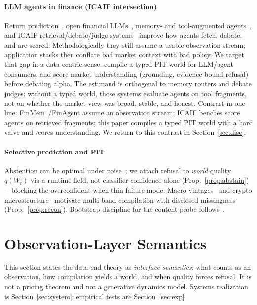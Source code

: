 \documentclass[sigconf,anonymous]{acmart}
\theoremstyle{acmdefinition}%
\theoremstyle{acmplain}%
\begin{document}
\paragraph{LLM agents in finance (ICAIF intersection)}
Return prediction~\cite{lopez2023chatgpt}, open financial LLMs~\cite{yang2023fingpt}, memory- and tool-augmented agents~\cite{yu2023finmem,li2023tradinggpt,zhang2024finagent,yao2023react}, and ICAIF retrieval/debate/judge systems~\cite{choi2025finagentbench,shen2025finsearch,sun2025finresearchbench,duan2025factormad} improve how agents fetch, debate, and are scored.
Methodologically they still assume a usable observation stream; application stacks then conflate bad market context with bad policy.
We target that gap in a data-centric sense: compile a typed PIT world for LLM/agent consumers, and score market understanding (grounding, evidence-bound refusal) before debating alpha.
The estimand is orthogonal to memory routers and debate judges: without a typed world, those systems evaluate agents on tool fragments, not on whether the market view was broad, stable, and honest.
Contrast in one line: FinMem~/FinAgent assume an observation stream; ICAIF benches score agents on retrieved fragments; this paper compiles a typed PIT world with a hard valve and scores understanding.
We return to this contrast in Section~\ref{sec:disc}.

\paragraph{Selective prediction and PIT}
Abstention can be optimal under noise~\cite{elyaniv2010,geifman2017}; we attach refusal to \emph{world} quality \(q(W_t)\) via a runtime field, not classifier confidence alone (Prop.~\ref{prop:abstain})---blocking the overconfident-when-thin failure mode.
Macro vintages~\cite{croushore2001} and crypto microstructure~\cite{makarov2020,liu2022} motivate multi-band compilation with disclosed missingness (Prop.~\ref{prop:recon}).
Bootstrap discipline for the content probe follows~\cite{white2000,politis1994,harvey2016}.

\section{Observation-Layer Semantics}
\label{sec:method}

This section states the data-end theory as \emph{interface semantics}: what counts as an observation, how compilation yields a world, and when quality forces refusal.
It is not a pricing theorem and not a generative dynamics model.
Systems realization is Section~\ref{sec:system}; empirical tests are Section~\ref{sec:exp}.
\end{document}
